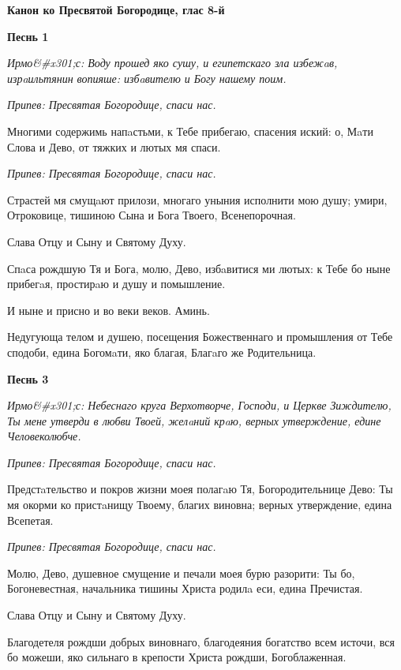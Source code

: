 \bfseries Канон ко Пресвятой Богородице, глас 8-й\normalfont{}




\bfseries Песнь 1\normalfont{}


\itshape Ирмо&#x301;с:\normalfont{} Воду прошед яко сушу, и египетскаго зла избежaв, изрaильтянин вопияше: избaвителю и Богу нашему поим.


\itshape Припев:\normalfont{} Пресвятая Богородице, спаси нас.


Многими содержимь напaстьми, к Тебе прибегаю, спасения иский: о, Мaти Слова и Дево, от тяжких и лютых мя спаси.


\itshape Припев:\normalfont{} Пресвятая Богородице, спаси нас.


Страстей мя смущaют прилози, многаго уныния исполнити мою душу; умири, Отроковице, тишиною Сына и Бога Твоего, Всенепорочная.


Слава Отцу и Сыну и Святому Духу.


Спaса рождшую Тя и Бога, молю, Дево, избaвитися ми лютых: к Тебе бо ныне прибегaя, простирaю и душу и помышление.


И ныне и присно и во веки веков. Аминь.


Недугующа телом и душею, посещения Божественнаго и промышления от Тебе сподоби, едина Богомaти, яко благая, Благaго же Родительница.




\bfseries Песнь 3\normalfont{}


\itshape Ирмо&#x301;с:\normalfont{} Небеснаго круга Верхотворче, Господи, и Церкве Зиждителю, Ты мене утверди в любви Твоей, желaний крaю, верных утверждение, едине Человеколюбче.


\itshape Припев:\normalfont{} Пресвятая Богородице, спаси нас.


Предстaтельство и покров жизни моея полагaю Тя, Богородительнице Дево: Ты мя окорми ко пристaнищу Твоему, благих виновна; верных утверждение, едина Всепетая.


\itshape Припев:\normalfont{} Пресвятая Богородице, спаси нас.


Молю, Дево, душевное смущение и печали моея бурю разорити: Ты бо, Богоневестная, начальника тишины Христа родилa еси, едина Пречистая.


Слава Отцу и Сыну и Святому Духу.


Благодетеля рождши добрых виновнаго, благодеяния богатство всем источи, вся бо можеши, яко сильнаго в крепости Христа рождши, Богоблаженная.



